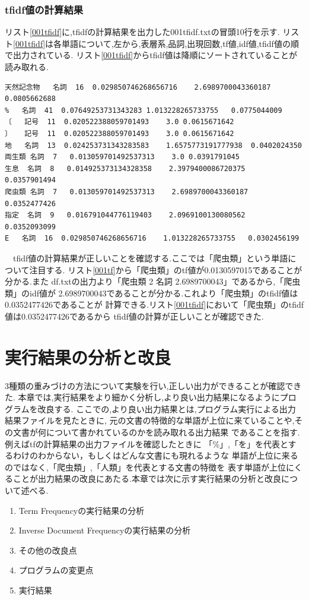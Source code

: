\documentclass[a4j]{jarticle}
\begin{document}
\subsubsection{tfidf値の計算結果}
リスト\ref{001tfidf}に,tfidfの計算結果を出力した001tfidf.txtの冒頭10行を示す.
リスト\ref{001tfidf}は各単語について,左から,表層系,品詞,出現回数,tf値,idf値,tfidf値の順で出力されている.
リスト\ref{001tfidf}からtfidf値は降順にソートされていることが読み取れる.
\begin{lstlisting}[basicstyle=\ttfamily\footnotesize, frame=single,label=001tfidf,caption=001tfidf.txtの冒頭10行]
天然記念物	名詞	16	0.029850746268656716	2.6989700043360187	0.0805662688
%	名詞	41	0.07649253731343283	1.013228265733755	0.0775044009
〔	記号	11	0.020522388059701493	3.0	0.0615671642
〕	記号	11	0.020522388059701493	3.0	0.0615671642
地	名詞	13	0.024253731343283583	1.6575773191777938	0.0402024350
両生類	名詞	7	0.013059701492537313	3.0	0.0391791045
生息	名詞	8	0.014925373134328358	2.3979400086720375	0.0357901494
爬虫類	名詞	7	0.013059701492537313	2.6989700043360187	0.0352477426
指定	名詞	9	0.016791044776119403	2.0969100130080562	0.0352093099
E	名詞	16	0.029850746268656716	1.013228265733755	0.0302456199
\end{lstlisting}
　tfidf値の計算結果が正しいことを確認する.ここでは「爬虫類」という単語について注目する.
リスト\ref{001tf}から「爬虫類」のtf値が0.0130597015であることが分かる.また
df.txtの出力より「爬虫類	2	名詞	2.6989700043」であるから,「爬虫類」のidf値が
2.6989700043であることが分かる.これより「爬虫類」のtfidf値は0.0352477426であることが
計算できる.リスト\ref{001tfidf}において「爬虫類」のtfidf値は0.0352477426であるから
tfidf値の計算が正しいことが確認できた.

\section{実行結果の分析と改良}
3種類の重みづけの方法について実験を行い,正しい出力ができることが確認できた.
本章では,実行結果をより細かく分析し,より良い出力結果になるようにプログラムを改良する.
ここでの,より良い出力結果とは,プログラム実行による出力結果ファイルを見たときに,
元の文書の特徴的な単語が上位に来ていることや,その文書が何について書かれているのかを読み取れる出力結果
であることを指す.例えばtfの計算結果の出力ファイルを確認したときに
「\%」,「を」を代表とするわけのわからない，もしくはどんな文書にも現れるような
単語が上位に来るのではなく,「爬虫類」,「人類」を代表とする文書の特徴を
表す単語が上位にくることが出力結果の改良にあたる.本章では次に示す実行結果の分析と改良について述べる.
\begin{enumerate}
	\item Term Frequencyの実行結果の分析
	\item Inverse Document Frequencyの実行結果の分析
	\item その他の改良点
	\item プログラムの変更点
	\item 実行結果
\end{enumerate}
\end{document}
